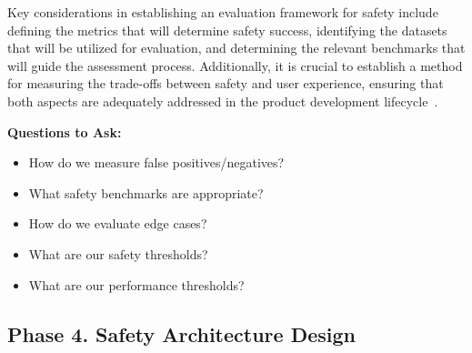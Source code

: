 Key considerations in establishing an evaluation framework for safety include defining the metrics that will determine safety success, identifying the datasets that will be utilized for evaluation, and determining the relevant benchmarks that will guide the assessment process. Additionally, it is crucial to establish a method for measuring the trade-offs between safety and user experience, ensuring that both aspects are adequately addressed in the product development lifecycle~.

\textbf{Questions to Ask:}
\begin{itemize}
    \item How do we measure false positives/negatives?
    \item What safety benchmarks are appropriate?
    \item How do we evaluate edge cases?
    \item What are our safety thresholds?
    \item What are our performance thresholds?
\end{itemize}

\subsection{Phase 4. Safety Architecture Design}

